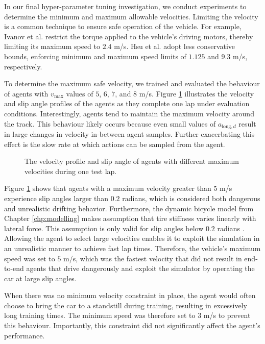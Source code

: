 In our final hyper-parameter tuning investigation, we conduct experiments to determine the minimum and maximum allowable velocities.
Limiting the velocity is a common technique to ensure safe operation of the vehicle.
For example, Ivanov et al. \cite{Ivanov2020} restrict the torque applied to the vehicle's driving motors, thereby limiting its maximum speed to $2.4$ m/s. 
Hsu et al. \cite{hsu2022} adopt less conservative bounds, enforcing minimum and maximum speed limits of $1.125$ and $9.3$ m/s, respectively.

To determine the maximum safe velocity, we trained and evaluated the behaviour of agents with $v_{\text{max}}$ values of $5$, $6$, $7$, and $8$ m/s.
Figure \ref{fig:vel_profile} illustrates the velocity and slip angle profiles of the agents as they complete one lap under evaluation conditions.
Interestingly, agents tend to maintain the maximum velocity around the track.
This behaviour likely occurs because even small values of $a_{\text{long},d}$ result in large changes in velocity in-between agent samples.
Further exacerbating this effect is the slow rate at which actions can be sampled from the agent.

\begin{figure}[htb!]
    \centering
    
    \caption{The velocity profile and slip angle of agents with different maximum velocities during one test lap.}
    \label{fig:vel_profile}
\end{figure}

Figure \ref{fig:vel_profile} shows that agents with a maximum velocity greater than $5$ m/s experience slip angles larger than $0.2$ radians, 
which is considered both dangerous and unrealistic drifting behavior.
Furthermore, the dynamic bicycle model from Chapter \ref{chp:modelling} makes assumption that tire stiffness varies linearly with lateral force.
This assumption is only valid for slip angles below $0.2$ radians \cite{Vorotovic2013}. 
Allowing the agent to select large velocities enables it to exploit the simulation in an unrealistic manner to achieve fast lap times.
Therefore, the vehicle's maximum speed was set to $5$ m/s, which was the fastest velocity that did not result in end-to-end agents that drive dangerously and exploit the simulator by operating the car at large slip angles.


When there was no minimum velocity constraint in place, the agent would often choose to bring the car to a standstill during training, resulting in excessively long training times.
The minimum speed was therefore set to $3$ m/s to prevent this behaviour.
Importantly, this constraint did not significantly affect the agent's performance.





